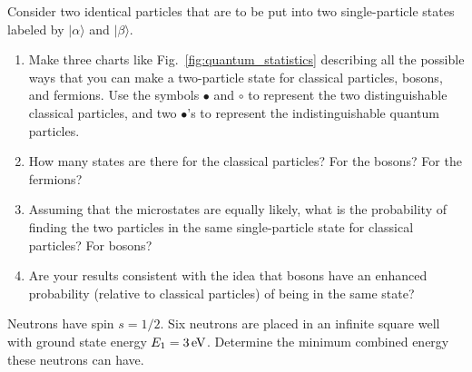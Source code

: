 \begin{problem}
  Consider two identical particles that are to be put into two single-particle
  states labeled by $|\alpha\rangle$ and $|\beta\rangle$.
  \begin{enumerate}
  \item Make three charts like Fig.~\ref{fig:quantum_statistics}
    describing all the possible ways that you can make a two-particle
    state for classical particles, bosons, and fermions.  Use the symbols
    $\bullet$ and $\circ$ to represent the two distinguishable
    classical particles, and two $\bullet$'s to represent the
    indistinguishable quantum particles.  

 \item How many states are there
    for the classical particles?  For the bosons?  For the fermions?

  \item Assuming that the microstates are equally likely, what is the
    probability of finding the two particles in the same
    single-particle state for classical particles?  For bosons?

  \item Are your results consistent with the idea that bosons have an
    enhanced probability (relative to classical particles) of being in
    the same state?
  \end{enumerate}
\end{problem}




\begin{problem}
  Neutrons have spin $s=1/2$.  Six neutrons are placed in an
infinite square well with ground state energy $E_1 = 3\,\mbox{eV}$.  Determine
the minimum combined energy these neutrons can have.
\end{problem}


